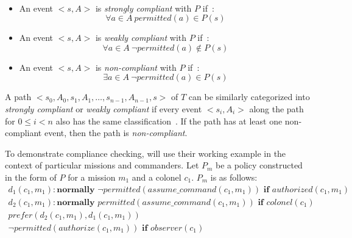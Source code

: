 \begin{definition}
    \label{def:authorization_event_compliance}
    ~

    \begin{itemize}
        \item An event $<s, A>$ is \textit{strongly compliant} with $P$ if~\citep{gelfond_authorization_2008}:
            \begin{equation}
                \forall a \in A\ permitted(a) \in P(s)
            \end{equation}
        \item An event $<s, A>$ is \textit{weakly compliant} with $P$ if~\citep{gelfond_authorization_2008}:
            \begin{equation}
                \forall a \in A\ \neg permitted(a) \not \in P(s)
            \end{equation}
        \item An event $<s, A>$ is \textit{non-compliant} with $P$ if~\citep{gelfond_authorization_2008}:
            \begin{equation}
                \exists a \in A\ \neg permitted(a) \in P(s)
            \end{equation}
    \end{itemize}
\end{definition}

\begin{definition}
    \label{def:authorization_path_compliance}
    A path $<s_0, A_0, s_1, A_1, \dots, s_{n-1}, A_{n-1}, s>$ of $T$ can be similarly categorized into \textit{strongly compliant} or \textit{weakly compliant} if every event $<s_i, A_i>$ along the path for $0 \le i < n$ also has the same classification~\citep{gelfond_authorization_2008}.
    If the path has at least one non-compliant event, then the path is \textit{non-compliant}.
\end{definition}

To demonstrate compliance checking, \citet{gelfond_authorization_2008} will use their working example in the context of particular missions and commanders.
Let $P_m$ be a policy constructed in the form of $P$ for a mission $m_1$ and a colonel $c_1$.
$P_m$ is as follows:
\begin{gather}
    d_1(c_1, m_1): \textbf{normally } \neg permitted(assume\_command(c_1, m_1)) \textbf{ if } authorized(c_1, m_1) \\
    d_2(c_1, m_1): \textbf{normally } permitted(assume\_command(c_1, m_1)) \textbf{ if } colonel(c_1) \\
    prefer(d_2(c_1,m_1),d_1(c_1,m_1)) \\
    \neg permitted(authorize(c_1, m_1)) \textbf{ if } observer(c_1)
\end{gather}

